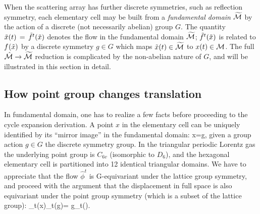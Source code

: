 \documentclass[aps,pre,
                showpacs,
                twocolumn,
                groupedaddress,
                floatfix]{revtex4-1}
\begin{document}

When the scattering array has further discrete symmetries, such as reflection
symmetry, each elementary cell may be built from a {\em fundamental domain}
${\widetilde {{\cal M}}}$ by the action of a discrete (not necessarily abelian) group
$G$. The quantity $\tilde x(t)\,=\,{\tilde{f}^{t}(\tilde x)}$ denotes the flow in the
fundamental domain ${\widetilde {{\cal M}}}$; ${\tilde{f}^{t}(\tilde x)}$ is related to
${f^{}(\tilde x)}$ by a discrete symmetry $g \in G$ which maps $\tilde x(t)\in
{\widetilde {\ensuremath{{\cal M}}}}$ to ${x}(t) \in {\ensuremath{{\cal M}}}$. The full $\hat {{\cal M}} \rightarrow {\widetilde
{\ensuremath{{\cal M}}}}$ reduction is complicated by the non-abelian nature of $G$, and will be
illustrated in this section in detail.

\subsection{How point group changes translation}


In fundamental domain, one has to realize a few facts before proceeding to the
cycle expansion derivation. A point $x$ in the elementary cell can be uniquely
identified by its ``mirror image'' in the fundamental domain:
\beq
x=g\circ\tx,
\eeq
given a group action $g\in G$ the discrete symmetry group. In the triangular
periodic Lorentz gas the underlying point group is $C_{6v}$ (isomorphic to
$D_6$), and the hexagonal elementary cell is partitioned into 12 identical
triangular domains. We have to appreciate that the flow $\hat{\phi}^t$ is
G-equivariant under the lattice group symmetry, and proceed with the argument
that the displacement in full space is also equivariant under the point group
symmetry (which is a subset of the lattice group):
\beq
\hn_t(x)\equiv\hn_t(g\circ\tx)= g\circ\hn_t(\tx).
\eeq
\end{document}
